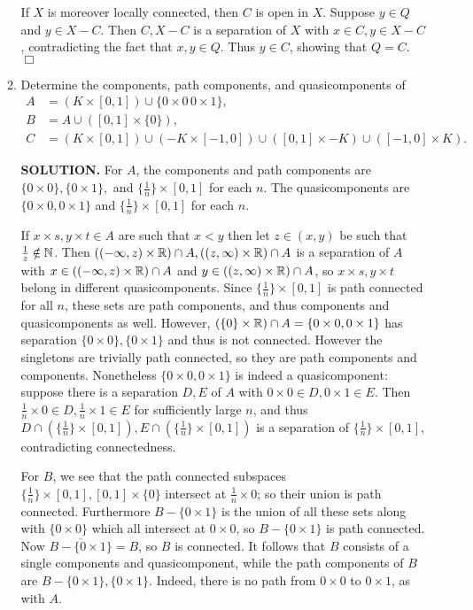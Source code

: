 \documentclass{article}
\begin{document}
\begin{enumerate}
\begin{enumerate}
        If $X$ is moreover locally connected, then $C$ is open in $X$. Suppose $y \in Q$ and $y \in X-C$. Then $C, X-C$ is a separation of $X$ with $x \in C, y \in X-C$, contradicting the fact that $x, y \in Q$. Thus $y \in C$, showing that $Q = C$. $\Box$

        \item Determine the components, path components, and quasicomponents of
        \begin{align*}
            A &= (K \times [0, 1]) \cup \{0 \times 0\, 0 \times 1\}, \\
            B &= A \cup ([0, 1] \times \{0\}), \\
            C &= (K \times [0, 1]) \cup (-K \times [-1, 0]) \cup ([0, 1] \times -K) \cup ([-1, 0] \times K).
        \end{align*}

        {\bf SOLUTION.} For $A$, the components and path components are $\{0 \times 0\}, \{0 \times 1\},$ and $\{\frac1n\} \times [0, 1]$ for each $n$. The quasicomponents are $\{0 \times 0, 0 \times 1\}$ and $\{\frac1n\} \times [0, 1]$ for each $n$.
        
        If $x \times s, y \times t \in A$ are such that $x < y$ then let $z \in (x, y)$ be such that $\frac1z \notin \mathbb{N}$. Then $((-\infty, z) \times \mathbb{R}) \cap A, ((z, \infty) \times \mathbb{R}) \cap A$ is a separation of $A$ with $x \in ((-\infty, z) \times \mathbb{R}) \cap A$ and $y \in ((z, \infty) \times \mathbb{R}) \cap A$, so $x \times s, y \times t$ belong in different quasicomponents. Since $\{\frac1n\} \times [0, 1]$ is path connected for all $n$, these sets are path components, and thus components and quasicomponents as well. However, $(\{0\} \times \mathbb{R}) \cap A = \{0 \times 0, 0 \times 1\}$ has separation $\{0\times 0\}, \{0 \times 1\}$ and thus is not connected. However the singletons are trivially path connected, so they are path components and components. Nonetheless $\{0 \times 0, 0 \times 1\}$ is indeed a quasicomponent: suppose there is a separation $D, E$ of $A$ with $0 \times 0 \in D, 0 \times 1 \in E$. Then $\frac1n \times 0 \in D, \frac1n \times 1 \in E$ for sufficiently large $n$, and thus $D\cap (\{\frac1n\} \times [0, 1]), E \cap (\{\frac1n\} \times [0, 1])$ is a separation of $\{\frac1n \} \times [0, 1]$, contradicting connectedness.
        
        For $B$, we see that the path connected subspaces $\{\frac1n\}\times [0, 1], [0, 1] \times \{0\}$ intersect at $\frac1n \times 0$; so their union is path connected. Furthermore $B - \{0 \times 1\}$ is the union of all these sets along with $\{0 \times 0\}$ which all intersect at $0 \times 0$, so $B - \{0 \times 1\}$ is path connected. Now $\overline{B - \{0\times 1\}} = B$, so $B$ is connected. It follows that $B$ consists of a single components and quasicomponent, while the path components of $B$ are $B-\{0\times 1\}, \{0\times 1\}$. Indeed, there is no path from $0 \times 0$ to $0\times 1$, as with $A$.


\end{enumerate}
\end{enumerate}
\end{document}
